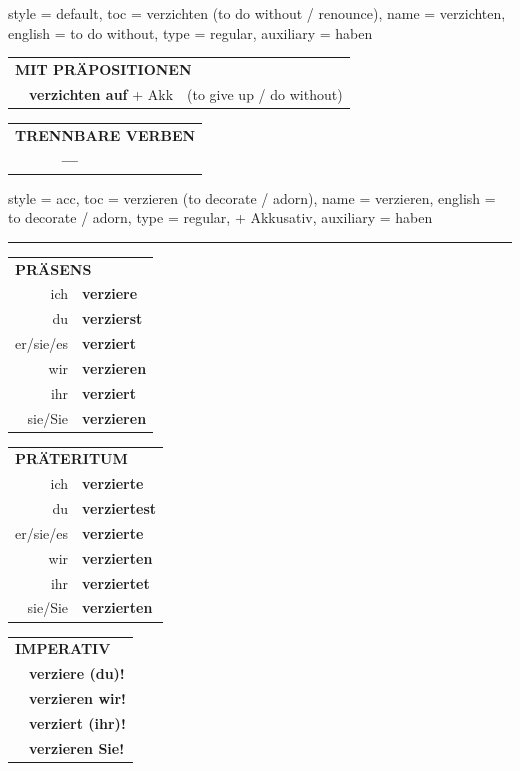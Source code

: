 \begin{verbentry}{
  style = {default},
  toc = {verzichten (to do without / renounce)},
  name = {verzichten},
  english = {to do without},
  type = {regular},
  auxiliary = {haben}
}
\vspace{10pt}

\begin{tabular}{lll}
\multicolumn{3}{l}{\textbf{MIT PRÄPOSITIONEN}}\\
& \textbf{verzichten auf} + Akk & (to give up / do without)\\
\end{tabular}
\hfill
\begin{tabular}{lll}
\multicolumn{3}{l}{\textbf{TRENNBARE VERBEN}}\\
& \textbf{---} & \\
\end{tabular}
\vspace{-5pt}
\end{verbentry}

\begin{verbentry}{
  style = {acc},
  toc = {verzieren (to decorate / adorn)},
  name = {verzieren},
  english = {to decorate / adorn},
  type = {regular, + Akkusativ},
  auxiliary = {haben}
}


\vspace{5pt}
\hrule
\vspace{5pt}

\begin{tabular}{rl}
\multicolumn{2}{l}{\textbf{PRÄSENS}}\\
ich & \textbf{verziere}\\
du & \textbf{verzierst}\\
er/sie/es & \textbf{verziert}\\
wir & \textbf{verzieren}\\
ihr & \textbf{verziert}\\
sie/Sie & \textbf{verzieren}\\
\end{tabular}
\hfill
\begin{tabular}{rl}
\multicolumn{2}{l}{\textbf{PRÄTERITUM}}\\
ich & \textbf{verzierte}\\
du & \textbf{verziertest}\\
er/sie/es & \textbf{verzierte}\\
wir & \textbf{verzierten}\\
ihr & \textbf{verziertet}\\
sie/Sie & \textbf{verzierten}\\
\end{tabular}
\hfill
\begin{tabular}{rl}
\multicolumn{2}{l}{\textbf{IMPERATIV}}\\
& \textbf{verziere (du)!}\\
& \textbf{verzieren wir!}\\
& \textbf{verziert (ihr)!}\\
& \textbf{verzieren Sie!}\\
\end{tabular}


\end{verbentry}
